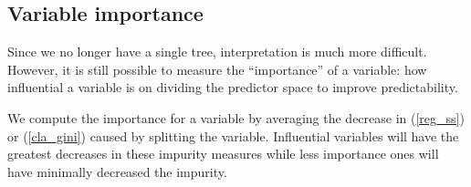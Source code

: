 \subsection{Variable importance}

Since we no longer have a single tree, interpretation is much more difficult. However, it is still possible to measure the ``importance'' of a variable: how influential a variable is on dividing the predictor space to improve predictability.

We compute the importance for a variable by averaging the decrease in (\ref{reg_ss}) or (\ref{cla_gini}) caused by splitting the variable. Influential variables will have the greatest decreases in these impurity measures while less importance ones will have minimally decreased the impurity.
